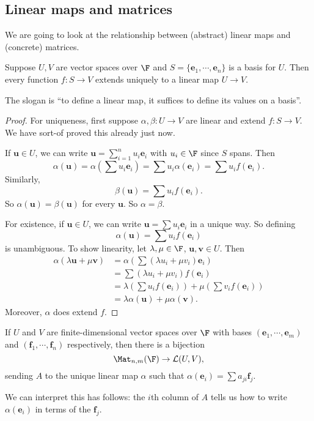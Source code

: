 \documentclass[a4paper]{article}
\begin{document}
\subsection{Linear maps and matrices}
We are going to look at the relationship between (abstract) linear maps and (concrete) matrices.
\begin{prop}
  Suppose $U, V$ are vector spaces over $\F$ and $S = \{\mathbf{e}_1, \cdots, \mathbf{e}_n\}$ is a basis for $U$. Then every function $f: S \to V$ extends uniquely to a linear map $U \to V$.
\end{prop}
The slogan is ``to define a linear map, it suffices to define its values on a basis''.

\begin{proof}
  For uniqueness, first suppose $\alpha, \beta: U \to V$ are linear and extend $f: S \to V$. We have sort-of proved this already just now.

  If $\mathbf{u}\in U$, we can write $\mathbf{u} = \sum_{i = 1}^n u_i \mathbf{e}_i$ with $u_i \in \F$ since $S$ spans. Then
  \[
    \alpha (\mathbf{u}) = \alpha\left(\sum u_i \mathbf{e}_i\right) = \sum u_i \alpha (\mathbf{e}_i) = \sum u_i f( \mathbf{e}_i).
  \]
  Similarly,
  \[
    \beta( \mathbf{u}) = \sum u_i f(\mathbf{e}_i).
  \]
  So $\alpha (\mathbf{u}) = \beta(\mathbf{u})$ for every $\mathbf{u}$. So $\alpha = \beta$.

  For existence, if $\mathbf{u} \in U$, we can write $\mathbf{u} = \sum u_i \mathbf{e}_i$ in a unique way. So defining
  \[
    \alpha(\mathbf{u}) = \sum u_i f(\mathbf{e}_i)
  \]
  is unambiguous. To show linearity, let $\lambda, \mu\in \F$, $\mathbf{u}, \mathbf{v}\in U$. Then
  \begin{align*}
    \alpha (\lambda \mathbf{u} + \mu \mathbf{v}) &= \alpha \left(\sum (\lambda u_i + \mu v_i) \mathbf{e}_i\right) \\
    &= \sum (\lambda u_i + \mu v_i) f(\mathbf{e}_i)\\
    &= \lambda \left(\sum u_i f(\mathbf{e}_i)\right) + \mu \left(\sum v_i f(\mathbf{e}_i)\right)\\
    &= \lambda \alpha(\mathbf{u}) + \mu \alpha(\mathbf{v}).
  \end{align*}
  Moreover, $\alpha$ does extend $f$.
\end{proof}

\begin{cor}
  If $U$ and $V$ are finite-dimensional vector spaces over $\F$ with bases $(\mathbf{e}_1, \cdots, \mathbf{e}_m)$ and $(\mathbf{f}_1, \cdots, \mathbf{f}_n)$ respectively, then there is a bijection
  \[
    \Mat_{n, m}(\F) \to \mathcal{L}(U, V),
  \]
  sending $A$ to the unique linear map $\alpha$ such that $\alpha(\mathbf{e}_i) = \sum a_{ji} \mathbf{f}_j$.
\end{cor}
We can interpret this has follows: the $i$th column of $A$ tells us how to write $\alpha (\mathbf{e}_i)$ in terms of the $\mathbf{f}_j$.
\end{document}
